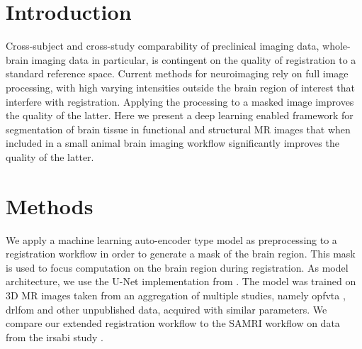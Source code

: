 \documentclass[11pt, english]{article}
\begin{document}
    \section{Introduction}
    Cross-subject and cross-study comparability of preclinical imaging data, whole-brain imaging data in particular, is contingent on the quality of registration to a standard reference space.
    Current methods for neuroimaging rely on full image processing, with high varying intensities outside the brain region of interest that interfere with registration.
    Applying the processing to a masked image improves the quality of the latter.
    Here we present a deep learning enabled framework for segmentation of brain tissue in functional and structural MR images that when included in a small animal brain imaging workflow significantly improves the quality of the latter.


    \section{Methods}
    We apply a machine learning auto-encoder type model as preprocessing to a registration workflow in order to generate a mask of the brain region.
    This mask is used to focus computation on the brain region during registration.
    As model architecture, we use the U-Net \citep{ronneberger_u-net:_2015} implementation from \citet{oktay_ozan-oktayattention-gated-networks_2020}.
    The model was trained on 3D MR images taken from an aggregation of multiple studies, namely opfvta \citep{ioanas_whole-brain_nodate}, drlfom \citep{imperfect_datasets} and other unpublished data, acquired with similar parameters.
    We compare our extended registration workflow to the SAMRI workflow \citep{samri} on data from the irsabi study \citep{irsabi_bidsdata}.

    \clearpage
    \printbibliography
\end{document}
